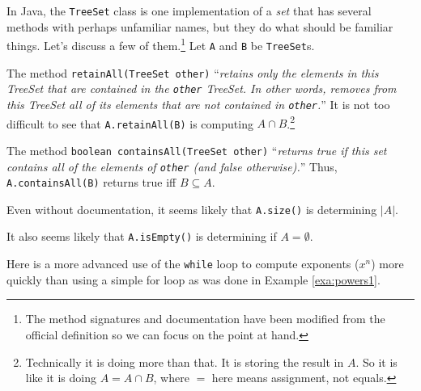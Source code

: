 \begin{exa}\label{exa:TreeSet}
In Java, the \verb+TreeSet+ class is one implementation of a {\em set} that has several methods
with perhaps unfamiliar names, but they do what should be familiar things.
Let's discuss a few of them.\footnote{The method signatures and documentation have been modified from the 
official definition so we can focus on the point at hand.}
Let \verb+A+ and \verb+B+ be \verb+TreeSet+s.
\begin{lenum}
\item  The method \verb+retainAll(TreeSet other)+
``{\em retains only the elements in this TreeSet that are contained in the \verb+other+ TreeSet. 
In other words, removes from this TreeSet all of its elements that are not contained in \verb+other+.}''
It is not too difficult to see that \verb+A.retainAll(B)+ is computing $A\cap B$.\footnote{Technically 
it is doing more than that.  It is storing the result in $A$.  So it is like it is doing $A=A\cap B$,
where $=$ here means assignment, not equals.}
\item  The method \verb+boolean containsAll(TreeSet other)+
``{\em returns true if this set contains all of the elements of \verb+other+ (and false otherwise).}''
Thus, \verb+A.containsAll(B)+ returns true iff $B\subseteq A$.
\item
Even without documentation, it seems likely that \verb+A.size()+ is determining $|A|$.
\item
It also seems likely that \verb+A.isEmpty()+ is determining if $A=\emptyset$.
\end{lenum}
\end{exa}

Here is a more advanced use of the \verb+while+ loop
to compute exponents ($x^n$) more quickly than 
using a simple for loop as was done in Example \ref{exa:powers1}. 

